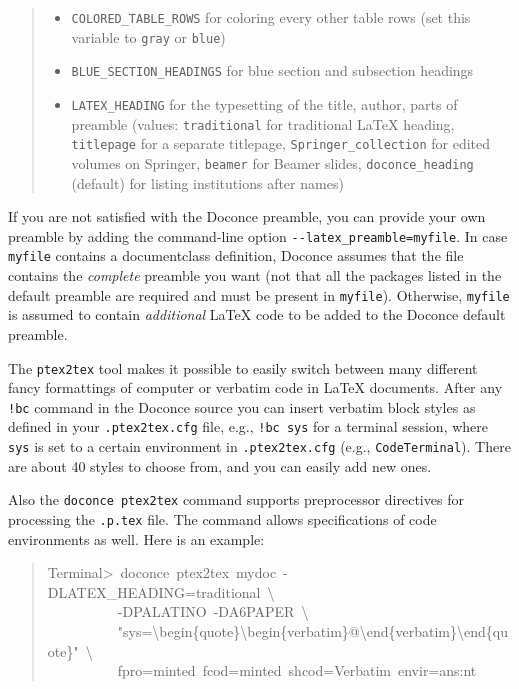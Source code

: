 \documentclass[a4paper]{article}
\begin{document}
\begin{quote}
\begin{itemize}
\item \texttt{COLORED\_TABLE\_ROWS} for coloring every other table rows (set this
variable to \texttt{gray} or \texttt{blue})

\item \texttt{BLUE\_SECTION\_HEADINGS} for blue section and subsection headings

\item \texttt{LATEX\_HEADING} for the typesetting of the title, author, parts of
preamble (values: \texttt{traditional} for traditional LaTeX heading,
\texttt{titlepage} for a separate titlepage, \texttt{Springer\_collection} for
edited volumes on Springer, \texttt{beamer} for Beamer slides, \texttt{doconce\_heading}
(default) for listing institutions after names)

\end{itemize}

\end{quote}

If you are not satisfied with the Doconce preamble, you can provide
your own preamble by adding the command-line option \texttt{-{}-latex\_preamble=myfile}.
In case \texttt{myfile} contains a documentclass definition, Doconce assumes
that the file contains the \emph{complete} preamble you want (not that all
the packages listed in the default preamble are required and must be
present in \texttt{myfile}). Otherwise, \texttt{myfile} is assumed to contain
\emph{additional} LaTeX code to be added to the Doconce default preamble.

The \texttt{ptex2tex} tool makes it possible to easily switch between many
different fancy formattings of computer or verbatim code in LaTeX
documents. After any \texttt{!bc} command in the Doconce source you can
insert verbatim block styles as defined in your \texttt{.ptex2tex.cfg}
file, e.g., \texttt{!bc sys} for a terminal session, where \texttt{sys} is set to
a certain environment in \texttt{.ptex2tex.cfg} (e.g., \texttt{CodeTerminal}).
There are about 40 styles to choose from, and you can easily add
new ones.

Also the \texttt{doconce ptex2tex} command supports preprocessor directives
for processing the \texttt{.p.tex} file. The command allows specifications
of code environments as well. Here is an example:
%
\begin{quote}{\ttfamily \raggedright \noindent
Terminal>~doconce~ptex2tex~mydoc~-DLATEX\_HEADING=traditional~\textbackslash{}\\
~~~~~~~~~~-DPALATINO~-DA6PAPER~\textbackslash{}\\
~~~~~~~~~~"sys=\textbackslash{}begin\{quote\}\textbackslash{}begin\{verbatim\}@\textbackslash{}end\{verbatim\}\textbackslash{}end\{quote\}"~\textbackslash{}\\
~~~~~~~~~~fpro=minted~fcod=minted~shcod=Verbatim~envir=ans:nt
}
\end{quote}
\end{document}
